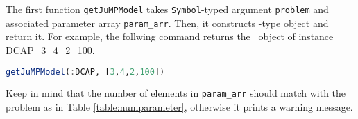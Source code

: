 The first function \texttt{getJuMPModel} takes \texttt{Symbol}-typed argument \texttt{problem} and associated parameter array \texttt{param\_arr}. Then, it constructs \jumpmodel-type object and return it. For example, the follwing command returns the \jumpmodel\ object of instance DCAP\_3\_4\_2\_100.
\begin{lstlisting}[frame=single,language=julia]
getJuMPModel(:DCAP, [3,4,2,100])
\end{lstlisting}
Keep in mind that the number of elements in \texttt{param\_arr} should match with the problem as in Table \ref{table:numparameter}, otherwise it prints a warning message.

\begin{table}[h]
	\centering
	\caption{\texttt{problem} arguments and corresponding parameter array}
	\label{table:numparameter}
\end{table}

